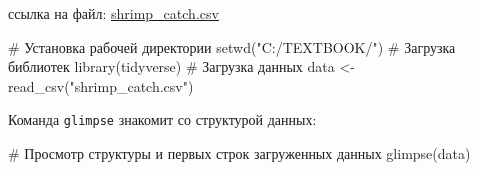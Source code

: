 \documentclass[
  letterpaper,
  DIV=11,
  numbers=noendperiod]{scrreprt}
\newenvironment{Shaded}{\begin{snugshade}}{\end{snugshade}}
\newcommand{\CommentTok}[1]{\textcolor[rgb]{0.37,0.37,0.37}{#1}}
\newcommand{\FunctionTok}[1]{\textcolor[rgb]{0.28,0.35,0.67}{#1}}
\newcommand{\NormalTok}[1]{\textcolor[rgb]{0.00,0.23,0.31}{#1}}
\newcommand{\OtherTok}[1]{\textcolor[rgb]{0.00,0.23,0.31}{#1}}
\newcommand{\StringTok}[1]{\textcolor[rgb]{0.13,0.47,0.30}{#1}}
\begin{document}
ссылка на файл:
\href{https://mombus.github.io/cRab/data/shrimp_catch.csv}{shrimp\_catch.csv}

\begin{Shaded}
\begin{Highlighting}[]
\CommentTok{\# Установка рабочей директории}
\FunctionTok{setwd}\NormalTok{(}\StringTok{"C:/TEXTBOOK/"}\NormalTok{)}
\CommentTok{\# Загрузка библиотек}
\FunctionTok{library}\NormalTok{(tidyverse)}
\CommentTok{\# Загрузка данных}
\NormalTok{data }\OtherTok{\textless{}{-}} \FunctionTok{read\_csv}\NormalTok{(}\StringTok{"shrimp\_catch.csv"}\NormalTok{)}
\end{Highlighting}
\end{Shaded}

Команда \texttt{glimpse} знакомит со структурой данных:

\begin{Shaded}
\begin{Highlighting}[]
\CommentTok{\# Просмотр структуры и первых строк загруженных данных}
\FunctionTok{glimpse}\NormalTok{(data)}
\end{Highlighting}
\end{Shaded}
\end{document}
